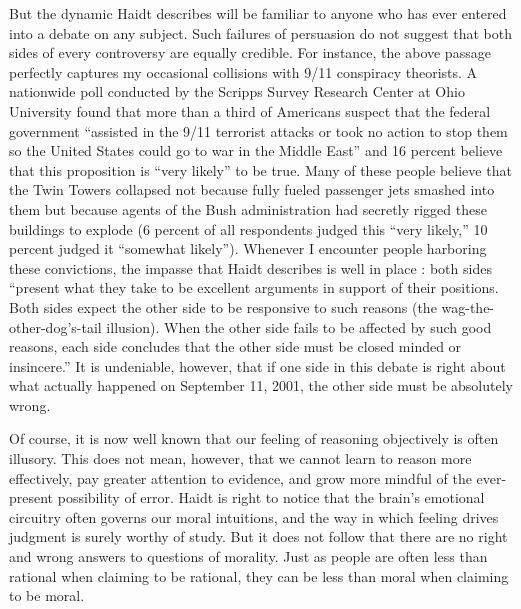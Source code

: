 \documentclass[a4paper,14pt]{extbook}
\begin{document}
But the dynamic Haidt describes will be familiar to anyone who has ever entered into a debate on any subject.
Such failures of persuasion do not suggest that both sides of every controversy are equally credible.
For instance, the above passage perfectly captures my occasional collisions with 9/11 conspiracy theorists.
A nationwide poll conducted by the Scripps Survey Research Center at Ohio University found that more than a third of Americans suspect that the federal government ``assisted in the 9/11 terrorist attacks or took no action to stop them so the United States could go to war in the Middle East'' and 16 percent believe that this proposition is ``very likely'' to be true.
Many of these people believe that the Twin Towers collapsed not because fully fueled passenger jets smashed into them but because agents of the Bush administration had secretly rigged these buildings to explode (6 percent of all respondents judged this ``very likely,'' 10 percent judged it ``somewhat likely'').
Whenever I encounter people harboring these convictions, the impasse that Haidt describes is well in place :
both sides ``present what they take to be excellent arguments in support of their positions.
Both sides expect the other side to be responsive to such reasons (the wag-the-other-dog's-tail illusion).
When the other side fails to be affected by such good reasons, each side concludes that the other side must be closed minded or insincere.''
It is undeniable, however, that if one side in this debate is right about what actually happened on September 11, 2001, the other side must be absolutely wrong.

Of course, it is now well known that our feeling of reasoning objectively is often illusory.
This does not mean, however, that we cannot learn to reason more effectively, pay greater attention to evidence, and grow more mindful of the ever-present possibility of error.
Haidt is right to notice that the brain's emotional circuitry often governs our moral intuitions, and the way in which feeling drives judgment is surely worthy of study.
But it does not follow that there are no right and wrong answers to questions of morality.
Just as people are often less than rational when claiming to be rational, they can be less than moral when claiming to be moral.
\end{document}
